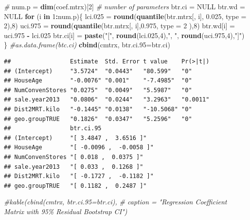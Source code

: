 \documentclass[
]{book}
\newenvironment{Shaded}{\begin{snugshade}}{\end{snugshade}}
\newcommand{\AttributeTok}[1]{\textcolor[rgb]{0.13,0.29,0.53}{#1}}
\newcommand{\CommentTok}[1]{\textcolor[rgb]{0.56,0.35,0.01}{\textit{#1}}}
\newcommand{\ConstantTok}[1]{\textcolor[rgb]{0.56,0.35,0.01}{#1}}
\newcommand{\ControlFlowTok}[1]{\textcolor[rgb]{0.13,0.29,0.53}{\textbf{#1}}}
\newcommand{\DecValTok}[1]{\textcolor[rgb]{0.00,0.00,0.81}{#1}}
\newcommand{\FloatTok}[1]{\textcolor[rgb]{0.00,0.00,0.81}{#1}}
\newcommand{\FunctionTok}[1]{\textcolor[rgb]{0.13,0.29,0.53}{\textbf{#1}}}
\newcommand{\NormalTok}[1]{#1}
\newcommand{\OtherTok}[1]{\textcolor[rgb]{0.56,0.35,0.01}{#1}}
\newcommand{\SpecialCharTok}[1]{\textcolor[rgb]{0.81,0.36,0.00}{\textbf{#1}}}
\newcommand{\StringTok}[1]{\textcolor[rgb]{0.31,0.60,0.02}{#1}}
\begin{document}
\begin{Shaded}
\begin{Highlighting}[]
\CommentTok{\#}
\NormalTok{num.p }\OtherTok{=} \FunctionTok{dim}\NormalTok{(coef.mtrx)[}\DecValTok{2}\NormalTok{]  }\CommentTok{\# number of parameters}
\NormalTok{btr.ci }\OtherTok{=} \ConstantTok{NULL}
\NormalTok{btr.wd }\OtherTok{=} \ConstantTok{NULL}
\ControlFlowTok{for}\NormalTok{ (i }\ControlFlowTok{in} \DecValTok{1}\SpecialCharTok{:}\NormalTok{num.p)\{}
\NormalTok{  lci}\FloatTok{.025} \OtherTok{=} \FunctionTok{round}\NormalTok{(}\FunctionTok{quantile}\NormalTok{(btr.mtrx[, i], }\FloatTok{0.025}\NormalTok{, }\AttributeTok{type =} \DecValTok{2}\NormalTok{),}\DecValTok{8}\NormalTok{)}
\NormalTok{  uci}\FloatTok{.975} \OtherTok{=} \FunctionTok{round}\NormalTok{(}\FunctionTok{quantile}\NormalTok{(btr.mtrx[, i],}\FloatTok{0.975}\NormalTok{, }\AttributeTok{type =} \DecValTok{2}\NormalTok{ ),}\DecValTok{8}\NormalTok{)}
\NormalTok{  btr.wd[i] }\OtherTok{=}\NormalTok{ uci}\FloatTok{.975} \SpecialCharTok{{-}}\NormalTok{ lci}\FloatTok{.025}
\NormalTok{  btr.ci[i] }\OtherTok{=} \FunctionTok{paste}\NormalTok{(}\StringTok{"["}\NormalTok{, }\FunctionTok{round}\NormalTok{(lci}\FloatTok{.025}\NormalTok{,}\DecValTok{4}\NormalTok{),}\StringTok{", "}\NormalTok{, }\FunctionTok{round}\NormalTok{(uci}\FloatTok{.975}\NormalTok{,}\DecValTok{4}\NormalTok{),}\StringTok{"]"}\NormalTok{)}
\NormalTok{\}}
\CommentTok{\#as.data.frame(btc.ci)}
\FunctionTok{cbind}\NormalTok{(cmtrx, }\AttributeTok{btr.ci.95=}\NormalTok{btr.ci)}
\end{Highlighting}
\end{Shaded}

\begin{verbatim}
##                 Estimate  Std. Error t value    Pr(>|t|)
## (Intercept)     "3.5724"  "0.0443"   "80.599"   "0"     
## HouseAge        "-0.0076" "0.001"    "-7.4985"  "0"     
## NumConvenStores "0.0275"  "0.0049"   "5.5987"   "0"     
## sale.year2013   "0.0806"  "0.0244"   "3.2963"   "0.0011"
## Dist2MRT.kilo   "-0.1445" "0.0138"   "-10.5068" "0"     
## geo.groupTRUE   "0.1826"  "0.0347"   "5.2596"   "0"     
##                 btr.ci.95               
## (Intercept)     "[ 3.4847 ,  3.6516 ]"  
## HouseAge        "[ -0.0096 ,  -0.0058 ]"
## NumConvenStores "[ 0.018 ,  0.0375 ]"   
## sale.year2013   "[ 0.033 ,  0.1268 ]"   
## Dist2MRT.kilo   "[ -0.1727 ,  -0.1182 ]"
## geo.groupTRUE   "[ 0.1182 ,  0.2487 ]"
\end{verbatim}

\begin{Shaded}
\begin{Highlighting}[]
\CommentTok{\#kable(cbind(cmtrx, btr.ci.95=btr.ci), }
\CommentTok{\#      caption = "Regression Coefficient Matrix with 95\% Residual Bootstrap CI")}
\end{Highlighting}
\end{Shaded}
\end{document}
